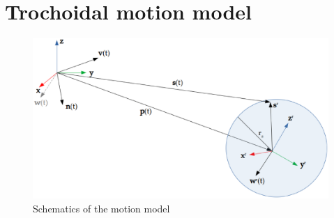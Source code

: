 \section{Trochoidal motion model}

\begin{figure}
  \centering
  \includegraphics[width=.8\textwidth]{img/schematics}
  \caption{Schematics of the motion model}
  \label{fig:schematics}
\end{figure}


